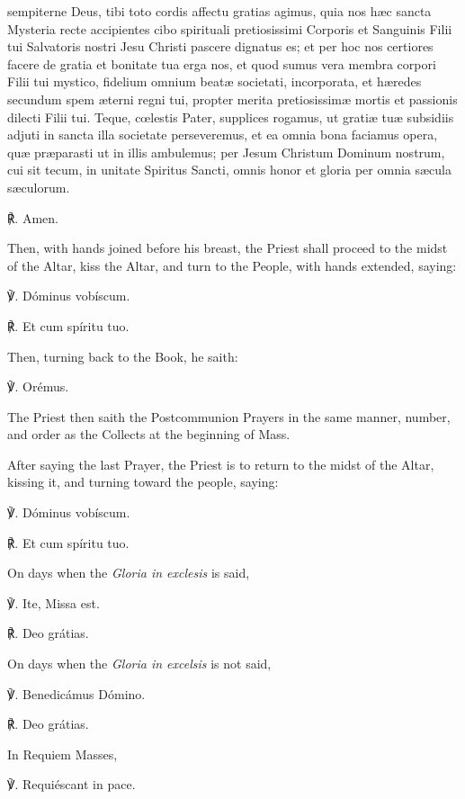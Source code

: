  sempiterne Deus, tibi toto cordis affectu gratias agimus, quia nos hæc sancta Mysteria recte accipientes cibo spirituali pretiosissimi Corporis et Sanguinis Filii tui Salvatoris nostri Jesu Christi pascere dignatus es; et per hoc nos certiores facere de gratia et bonitate tua erga nos, et quod sumus vera membra corpori Filii tui mystico, fidelium omnium beatæ societati, incorporata, et hæredes secundum spem æterni regni tui, propter merita pretiosissimæ mortis et passionis dilecti Filii tui. Teque, cœlestis Pater, supplices rogamus, ut gratiæ tuæ subsidiis adjuti in sancta illa societate perseveremus, et ea omnia bona faciamus opera, quæ præparasti ut in illis ambulemus; per Jesum Christum Dominum nostrum, cui sit tecum, in unitate Spiritus Sancti, omnis honor et gloria per omnia sæcula sæculorum.\par
℟. Amen.


\begin{rubric}
    Then, with hands joined before his breast, the Priest shall proceed to the midst of the Altar, kiss the Altar, and turn to the People, with hands extended, saying:
\end{rubric}
℣. Dóminus vobíscum.

℟. Et cum spíritu tuo.
\begin{rubric}
    Then, turning back to the Book, he saith:
\end{rubric}
℣. Orémus.
\begin{rubric}
The Priest then saith the Postcommunion Prayers in the same manner, number, and order as the Collects at the beginning of Mass.
\end{rubric}
\begin{rubric}
    After saying the last Prayer, the Priest is to return to the midst of the Altar, kissing it, and turning toward the people, saying:
\end{rubric}
℣. Dóminus vobíscum.

℟. Et cum spíritu tuo.
    \begin{rubric}
    	{On days when the \emph{Gloria in exclesis} is said,}
    \end{rubric}
    ℣. Ite, Missa est.
    
    ℟. Deo grátias.
    \begin{rubric}
    	{On days when the \emph{Gloria in excelsis} is not said,}
    \end{rubric}
    ℣. Benedicámus Dómino.
    
    ℟. Deo grátias.
\begin{rubric}
In Requiem Masses,
\end{rubric}
    ℣. Requiéscant in pace.
    
